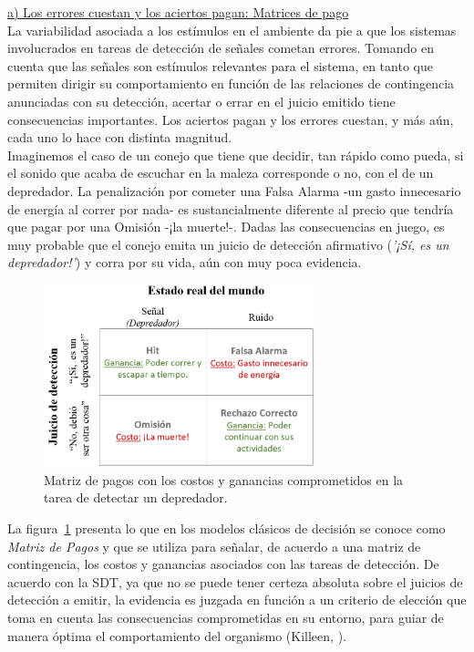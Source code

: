       \underline{a) Los errores cuestan y los aciertos pagan: Matrices de pago}\\

La variabilidad asociada a los estímulos en el ambiente da pie a que los sistemas involucrados en tareas de detección de señales cometan errores. Tomando en cuenta que las señales son estímulos relevantes para el sistema, en tanto que permiten dirigir su comportamiento en función de las relaciones de contingencia anunciadas con su detección, acertar o errar en el juicio emitido tiene consecuencias importantes. Los aciertos pagan y los errores cuestan, y más aún, cada uno lo hace con distinta magnitud.\\

Imaginemos el caso de un conejo que tiene que decidir, tan rápido como pueda, si el sonido que acaba de escuchar en la maleza corresponde o no, con el de un depredador. La penalización por cometer una Falsa Alarma -un gasto innecesario de energía al correr por nada- es sustancialmente diferente al precio que tendría que pagar por una Omisión -¡la muerte!-. Dadas las consecuencias en juego, es muy probable que el conejo emita un juicio de detección afirmativo (\textit{'¡Sí, es un depredador!'}) y corra por su vida, aún con muy poca evidencia.\\

\begin{figure}[h]
\centering
\includegraphics[width=0.7\textwidth]{Figures/Matriz_Pagos} 
\decoRule
\caption[Matriz de Pagos: Consecuencias comprometidas en una tarea de detección hipotética (ejemplo)]{Matriz de pagos con los costos y ganancias comprometidos en la tarea de detectar un depredador.}
\label{fig:Mat_Pagos}
\end{figure}

La figura~\ref{fig:Mat_Pagos} presenta lo que en los modelos clásicos de decisión se conoce como \textit{Matriz de Pagos} y que se utiliza para señalar, de acuerdo a una matriz de contingencia, los costos y ganancias asociados con las tareas de detección. De acuerdo con la SDT, ya que no se puede tener certeza absoluta sobre el juicios de detección a emitir, la evidencia es juzgada en función a un criterio de elección que toma en cuenta las consecuencias comprometidas en su entorno, para guiar de manera óptima el comportamiento del organismo (Killeen, \citeyear{Killeen2014}).\\

